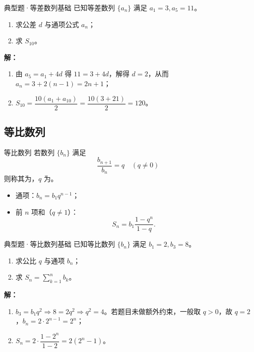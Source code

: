 \documentclass[a4paper,11pt]{ctexart}
\begin{document}
\begin{examplebox}{典型题·等差数列基础}
  已知等差数列 $\{a_n\}$ 满足 $a_1=3,a_5=11$。
  \begin{enumerate}
    \item 求公差 $d$ 与通项公式 $a_n$；
    \item 求 $S_{10}$。
  \end{enumerate}
  \textbf{解：}
  \begin{enumerate}
    \item 由 $a_5=a_1+4d$ 得 $11=3+4d$，解得 $d=2$，从而 $a_n=3+2(n-1)=2n+1$；
    \item $S_{10}=\dfrac{10(a_1+a_{10})}{2}=\dfrac{10(3+21)}{2}=120$。
  \end{enumerate}
\end{examplebox}

\subsection{等比数列}
\begin{definitionbox}{等比数列}
  若数列 $\{b_n\}$ 满足
  \[
    \frac{b_{n+1}}{b_n} = q\quad(q\ne0)
  \]
  则称其为，$q$ 为。
  \begin{itemize}
    \item 通项：$b_n = b_1 q^{n-1}$；
    \item 前 $n$ 项和（$q\ne1$）：
    \[
      S_n = b_1\frac{1-q^{n}}{1-q}.
    \]
  \end{itemize}
\end{definitionbox}

\begin{examplebox}{典型题·等比数列基础}
  已知等比数列 $\{b_n\}$ 满足 $b_1=2,b_3=8$。
  \begin{enumerate}
    \item 求公比 $q$ 与通项 $b_n$；
    \item 求 $\displaystyle S_n=\sum_{k=1}^n b_k$。
  \end{enumerate}
  \textbf{解：}
  \begin{enumerate}
    \item $b_3=b_1q^2\Rightarrow 8=2q^2\Rightarrow q^2=4$。若题目未做额外约束，一般取 $q>0$，故 $q=2$，$b_n=2\cdot2^{n-1}=2^n$；
    \item $S_n=2\cdot\dfrac{1-2^{n}}{1-2}=2(2^{n}-1)$。
  \end{enumerate}
\end{examplebox}
\end{document}
